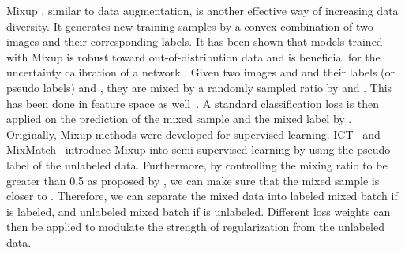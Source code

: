 \documentclass[runningheads]{llncs}
\begin{document}
Mixup \cite{zhang2018mixup,yun2019cutmix,yun2019cutmix,hendrycks2020augmix}, similar to data augmentation, is another effective way of increasing data diversity.
It generates new training samples by a convex combination of two images and their corresponding labels.
It has been shown that models trained with Mixup is robust toward out-of-distribution data \cite{guo2019mixup} and is beneficial for the uncertainty calibration of a network \cite{thulasidasan2019mixup}.
Given two images  and  and their labels (or pseudo labels)   and , they are mixed by a randomly sampled ratio  by  and . This has been done in feature space as well~\cite{verma2018manifold}.
A standard classification loss  is then applied on the prediction of the mixed sample  and the mixed label  by .
Originally, Mixup methods were developed for supervised learning.
ICT~\cite{verma2019interpolation} and MixMatch~\cite{berthelot2019mixmatch} introduce Mixup into semi-supervised learning by using the pseudo-label of the unlabeled data.
Furthermore, by controlling the mixing ratio  to be greater than 0.5 as proposed by \cite{berthelot2019mixmatch}, we can make sure that the mixed sample is closer to .
Therefore, we can separate the mixed data into labeled mixed batch  if  is labeled, and unlabeled mixed batch  if  is unlabeled.
Different loss weights can then be applied to modulate the strength of regularization from the unlabeled data.
\end{document}
